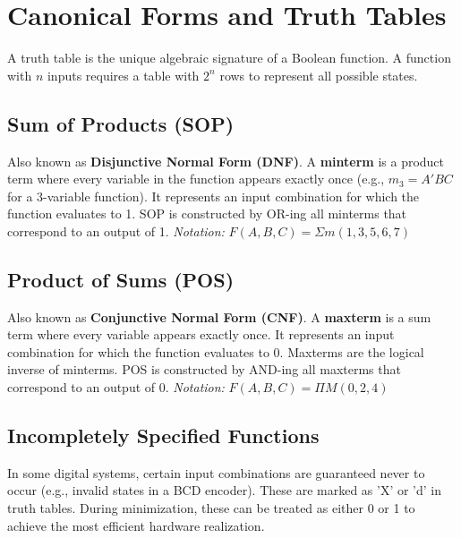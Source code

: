 \section{Canonical Forms and Truth Tables}

\begin{remark}
A truth table is the unique algebraic signature of a Boolean function. A function with $n$ inputs requires a table with $2^n$ rows to represent all possible states.
\end{remark}

\subsection{Sum of Products (SOP)}
\begin{definition}
Also known as \textbf{Disjunctive Normal Form (DNF)}. A \textbf{minterm} is a product term where every variable in the function appears exactly once (e.g., $m_3 = A'BC$ for a 3-variable function). It represents an input combination for which the function evaluates to 1. SOP is constructed by OR-ing all minterms that correspond to an output of 1.
\textit{Notation:} $F(A,B,C) = \Sigma m(1, 3, 5, 6, 7)$
\end{definition}

\subsection{Product of Sums (POS)}
\begin{definition}
Also known as \textbf{Conjunctive Normal Form (CNF)}. A \textbf{maxterm} is a sum term where every variable appears exactly once. It represents an input combination for which the function evaluates to 0. Maxterms are the logical inverse of minterms. POS is constructed by AND-ing all maxterms that correspond to an output of 0.
\textit{Notation:} $F(A,B,C) = \Pi M(0, 2, 4)$
\end{definition}

\subsection{Incompletely Specified Functions}
\begin{vocabulary}
In some digital systems, certain input combinations are guaranteed never to occur (e.g., invalid states in a BCD encoder). These are marked as 'X' or 'd' in truth tables. During minimization, these can be treated as either 0 or 1 to achieve the most efficient hardware realization.
\end{vocabulary}

